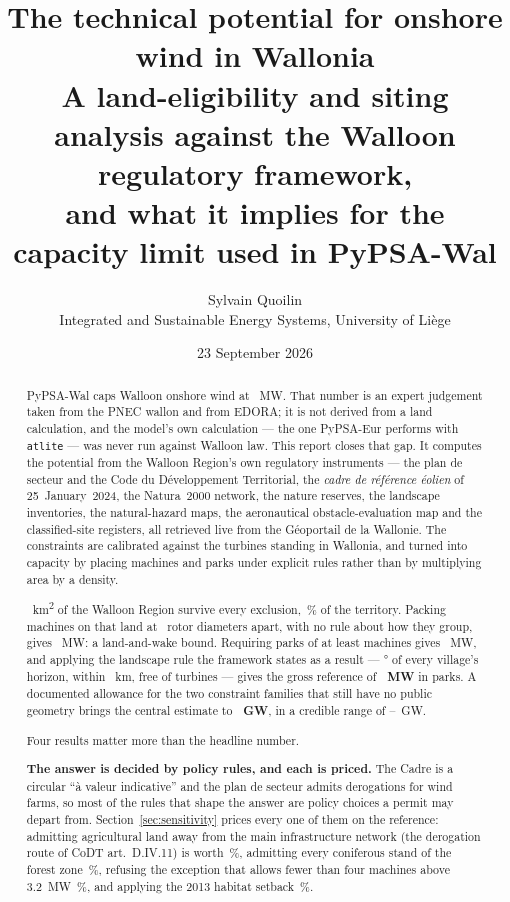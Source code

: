 \documentclass[11pt,a4paper]{article}
\title{\textbf{The technical potential for onshore wind in Wallonia}\\[2mm]
\large A land-eligibility and siting analysis against the Walloon regulatory
framework,\\ and what it implies for the capacity limit used in PyPSA-Wal}
\author{Sylvain Quoilin \\ \small Integrated and Sustainable Energy Systems, University of Liège}
\date{23 September 2026}
\begin{document}
\maketitle
\thispagestyle{fancy}

\begin{abstract}
\noindent
PyPSA-Wal caps Walloon onshore wind at \CapToday{}~MW. That number is an expert
judgement taken from the PNEC wallon and from EDORA; it is not derived from a
land calculation, and the model's own calculation --- the one PyPSA-Eur performs
with \texttt{atlite} --- was never run against Walloon law. This report closes
that gap. It computes the potential from the Walloon Region's own regulatory
instruments --- the plan de secteur and the Code du Développement Territorial,
the \emph{cadre de référence éolien} of 25~January~2024, the Natura~2000
network, the nature reserves, the landscape inventories, the natural-hazard
maps, the aeronautical obstacle-evaluation map and the classified-site
registers, all retrieved live from the Géoportail de la Wallonie. The
constraints are calibrated against the \FleetN{} turbines standing in Wallonia,
and turned into capacity by placing machines and parks under explicit rules
rather than by multiplying area by a density.

\AdminEligible{}~\si{\square\kilo\metre} of the Walloon Region survive every
exclusion, \AdminEligibleShare{}\,\% of the territory. Packing machines on that
land at \PlaceRotorD{}~rotor diameters apart, with no rule about how they group,
gives \FreePnom{}~MW: a land-and-wake bound. Requiring parks of at least
\PlaceMinTurbines{} machines gives \NoHorizonPnom{}~MW, and applying the
landscape rule the framework states as a result --- \PlaceAzimuth{}° of every
village's horizon, within \PlaceHorizonRadius{}~km, free of turbines --- gives
the gross reference of \textbf{\PlacePnom{}~MW} in \PlaceParks{} parks. A
documented allowance for the two constraint families that still have no public
geometry brings the central estimate to \textbf{\CredibleCentralGW{}~GW}, in a
credible range of \CredibleLowGW{}--\CredibleHighGW{}~GW.

Four results matter more than the headline number.

\textbf{The answer is decided by policy rules, and each is priced.} The Cadre is
a circular ``à valeur indicative'' and the plan de secteur admits derogations
for wind farms, so most of the rules that shape the answer are policy choices
a permit may depart from. Section~\ref{sec:sensitivity} prices every one of them
on the reference: admitting agricultural land away from the main infrastructure
network (the derogation route of CoDT art.~D.IV.11) is worth
\SensNoCorridorPct{}\,\%, admitting every coniferous stand of the forest zone
\SensForestConifPct{}\,\%, refusing the exception that allows fewer than four
machines above \SI{3.2}{\mega\watt} \SensParksFourPct{}\,\%, and applying the
2013 habitat setback \SensHabitatOldPct{}\,\%.


\end{abstract}
\end{document}
